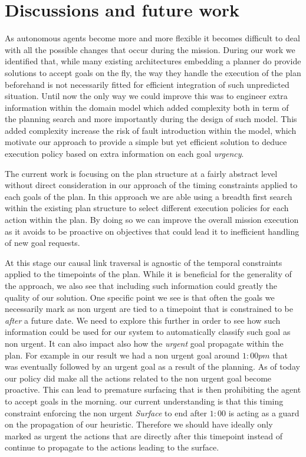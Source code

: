 \section{Discussions and future work}
\label{sec:conclude}

As autonomous agents become more and more flexible it becomes difficult
to deal with all the possible changes that occur during the
mission. During our work we identified that, while many existing 
architectures embedding a planner do provide solutions to accept goals
on the fly, the way they handle the execution of the plan beforehand
is not necessarily fitted for efficient integration of such unpredicted
situation. Until now the only way we could improve this was to engineer
extra information within the domain model which added complexity both in
term of the planning search and more importantly during the design of
such model. This added complexity increase the risk of fault
introduction within the model, which motivate our approach to provide 
a simple but yet efficient solution to deduce execution policy based
on extra information on each goal {\em urgency}.

The current work is focusing on the plan structure at a fairly
abstract level without direct consideration in our approach of the
timing constraints applied to each goals of the plan. In this approach
we are able using a breadth first search within the existing plan
structure to select different execution policies for each action
within the plan. By doing so we can improve the overall mission 
execution as it avoids to be proactive on objectives that could lead it
to inefficient handling of new goal requests.

At this stage our causal link traversal is agnostic of the temporal 
constraints applied to the timepoints of the plan. While it is
beneficial for the generality of the approach, we also see that
including such information could greatly the quality of our solution. 
One specific point we see is that often the goals we necessarily mark
as non urgent are tied to a timepoint that is constrained to be {\em
  after} a future date. We need to explore this further in order to
see how such information could be used for our system to automatically
classify such goal as non urgent. It can also impact  also how the
{\em urgent} goal propagate within the plan. For example in our result
we had a non urgent goal around $1:00 pm$ that was eventually 
followed by an urgent goal as a result of the planning. As of today 
our policy did make all the actions related to the non urgent goal 
become proactive. This can lead to premature surfacing that is then 
prohibiting the agent to accept goals in the morning. our current
understanding is that this timing constraint enforcing the non
urgent {\em Surface} to end after $1:00$ is acting as a guard on the
propagation of our heuristic. Therefore we should have ideally only
marked as urgent the actions that are directly after this timepoint
instead of continue to propagate to the actions leading to the
surface. 

